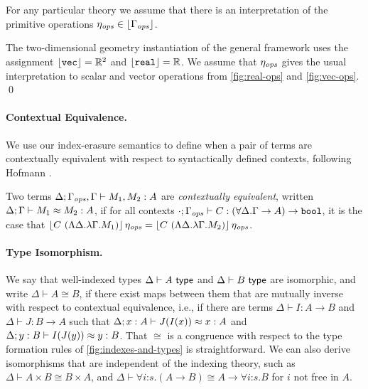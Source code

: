 For any particular theory we assume that there is an
interpretation of the primitive operations $\eta_{\mathit{ops}} \in \left\lfloor \Gamma_{\mathit{ops}} \right\rfloor$.

\begin{example*}
  The two-dimensional geometry instantiation of the general framework
  uses the assignment $\left\lfloor \textup{\texttt{vec}} \right\rfloor = \mathbb{R}^2$ and
  $\left\lfloor \textup{\texttt{real}} \right\rfloor = \mathbb{R}$.
  We assume that $\eta_{\mathit{ops}}$ gives the usual interpretation to scalar
  and vector operations from
  \autoref{fig:real-ops} and \autoref{fig:vec-ops}.
\qed
\end{example*}



\paragraph{Contextual Equivalence.}
We use our index-erasure semantics to define when a pair of terms
are contextually equivalent with respect to syntactically defined
contexts, following Hofmann \cite{hofmann08correctness}.

\begin{definition}\label{defn:ctxt-equiv}
Two terms $\Delta; \Gamma_{\mathit{ops}}, \Gamma \vdash M_1, M_2 : A$
are \emph{contextually equivalent}, written ${\Delta};{\Gamma}\vdash{M_1}\approx{M_2}:{A}$, if 
  for all
  contexts $\cdot;\Gamma_{\mathit{ops}} \vdash C : (\forall \Delta. \Gamma
  \to A) \to \textup{\texttt{bool}}$, it is the case that $\left\lfloor{C\ (\Lambda
    \Delta. \lambda \Gamma. M_1)}\right\rfloor\eta_{\mathit{ops}} = \left\lfloor{C\
    (\Lambda \Delta. \lambda \Gamma. M_2)}\right\rfloor\eta_{\mathit{ops}}$.
\end{definition}


\paragraph{Type Isomorphism.}
We say that well-indexed types $\Delta \vdash A \textup{\textsf{ type}}$ and $\Delta\vdash B \textup{\textsf{ type}}$
are isomorphic, and write $\Delta\vdash A \cong
B$, if there exist maps between them that are mutually inverse with
respect to contextual equivalence, i.e., if there are terms $\Delta\vdash I
: A \to B$ and $\Delta\vdash J : B\to A$ such that ${\Delta};{x:A}\vdash{J(I(x))}\approx{x}:{A}$ 
and ${\Delta};{y:B}\vdash{I(J(y))}\approx{y}:{B}$.
That $\cong$ is a congruence with respect to the type formation rules
of \autoref{fig:indexes-and-types} is straightforward. We can also
derive isomorphisms that are independent of the indexing theory, such
as $\Delta\vdash A\times B \cong B \times A$, and $\Delta\vdash\forall
i\mathord:s.(A\to B)\cong A\to\forall i\mathord:s.B$ for $i$ not free in $A$.

